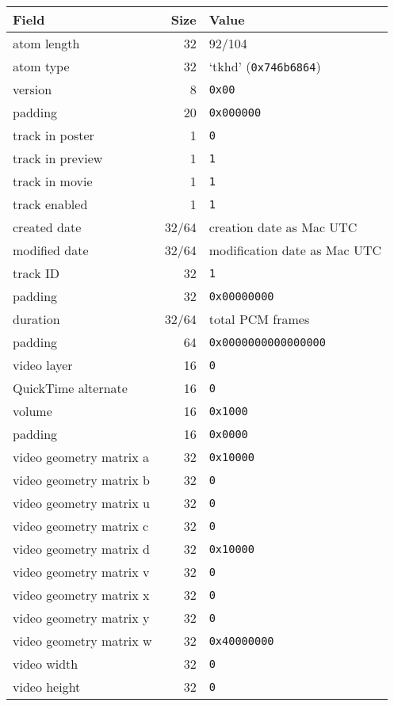 \begin{table}[h]
\begin{tabular}{|l|r|l|}
\hline
Field & Size & Value \\
\hline
atom length & 32 & 92/104 \\
atom type & 32 & `tkhd' (\texttt{0x746b6864}) \\
\hline
version & 8 & \texttt{0x00} \\
padding & 20 & \texttt{0x000000} \\
track in poster & 1 & \texttt{0} \\
track in preview & 1 & \texttt{1} \\
track in movie & 1 & \texttt{1} \\
track enabled & 1 & \texttt{1} \\
created date & 32/64 & creation date as Mac UTC \\
modified date & 32/64 & modification date as Mac UTC \\
track ID & 32 & \texttt{1} \\
padding & 32 & \texttt{0x00000000} \\
duration & 32/64 & total PCM frames \\
padding & 64 & \texttt{0x0000000000000000} \\
video layer & 16 & \texttt{0} \\
QuickTime alternate & 16 & \texttt{0} \\
volume & 16 & \texttt{0x1000} \\
padding & 16 & \texttt{0x0000} \\
video geometry matrix a & 32 & \texttt{0x10000} \\
video geometry matrix b & 32 & \texttt{0} \\
video geometry matrix u & 32 & \texttt{0} \\
video geometry matrix c & 32 & \texttt{0} \\
video geometry matrix d & 32 & \texttt{0x10000} \\
video geometry matrix v & 32 & \texttt{0} \\
video geometry matrix x & 32 & \texttt{0} \\
video geometry matrix y & 32 & \texttt{0} \\
video geometry matrix w & 32 & \texttt{0x40000000} \\
video width & 32 & \texttt{0} \\
video height & 32 & \texttt{0} \\
\hline
\end{tabular}
\end{table}

